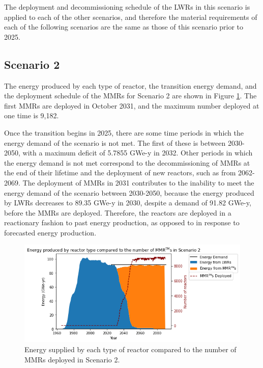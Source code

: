 The deployment and decommissioning schedule of the \glspl{LWR} in this 
scenario is 
applied to each of the other scenarios, and therefore the material 
requirements of each of the following scenarios are the same as those 
of this scenario prior to 2025. 

\subsection{Scenario 2}
The energy produced by each type of reactor, the transition energy demand, 
and the deployment schedule of the \glspl{MMR} for Scenario 2 are shown in 
Figure \ref{fig:energy_rx_2}. The first \glspl{MMR} are deployed in 
October 2031, and the 
maximum number deployed at one time is 
9,182. 

Once the transition begins in 2025, there are some time periods in which 
the energy demand of the scenario is 
not met. The first of these is between 2030-2050, with a maximum deficit 
of 5.7855 GWe-y in 2032. Other periods in which the energy demand is not met 
correspond to the decommissioning of \glspl{MMR} at the end of their lifetime 
and the deployment of new reactors, such as from 2062-2069. 
The deployment of \glspl{MMR} in 2031 contributes to the inability to 
meet the energy demand of the scenario between 2030-2050, because the energy 
produced by 
\glspl{LWR} decreases to 89.35 GWe-y in 2030, despite a demand of 91.82
GWe-y, before the \glspl{MMR} are 
deployed. Therefore, the reactors are deployed in a reactionary fashion to 
past energy production, as opposed to in response to forecasted energy 
production.

\begin{figure}
    \centering 
    \includegraphics[width=\textwidth]{../figures/energy_scenario2.png}
    \caption{Energy supplied by each type of reactor compared to the number of 
    \glspl{MMR} deployed in Scenario 2.}
    \label{fig:energy_rx_2}
\end{figure}

